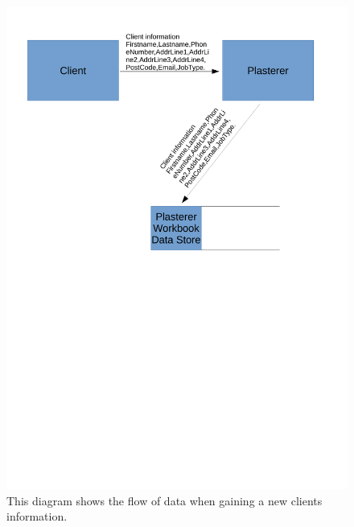 \begin{figure}[H]
    \includegraphics[scale=0.5]{./Analysis/images/ClientInformation.pdf}
    \caption{This diagram shows the flow of data when gaining a new clients information.} \label{fig:client_information_data_flow_diagram}
\end{figure}

